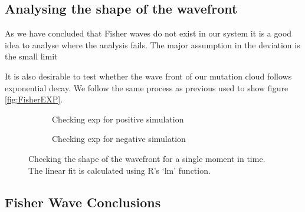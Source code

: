 \documentclass[12pt, a4paper,]{article}
\begin{document}
\begin{figure}[H]
	\centering
	\begin{subfigure}[h]{0.5 \textwidth}
		
	\end{subfigure}%
	\begin{subfigure}[h]{0.5 \textwidth}
		
	\end{subfigure}
\end{figure}

\subsection{Analysing the shape of the wavefront}

As we have concluded that Fisher waves do not exist in our system it is a good idea to analyse where the analysis fails. 
The major assumption in the deviation is the small limit 

It is also desirable to test whether the wave front of our mutation cloud follows exponential decay. We follow the same process as previous used to show figure \ref{fig:FisherEXP}. 

\begin{figure}[H]
\begin{subfigure}[h]{0.5 \textwidth}
		
	\caption{Checking exp for positive simulation}
\end{subfigure}
\begin{subfigure}[h]{0.5 \textwidth}
		
	\caption{Checking exp for negative simulation}
\end{subfigure}
\caption{Checking the shape of the wavefront for a single moment in time. The linear fit is calculated using R's `lm' function.  }
\end{figure}

\begin{figure}[H]
\centering
	\begin{subfigure}[h]{0.5 \textwidth}
		
	\end{subfigure}%
	\begin{subfigure}[h]{0.5 \textwidth}
		
	\end{subfigure}
\end{figure}

\begin{figure}[H]
\centering

\end{figure}

\subsection{Fisher Wave Conclusions}
\end{document}
